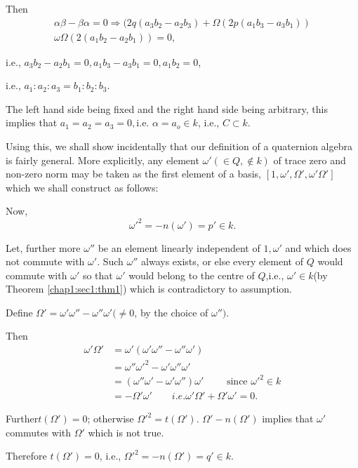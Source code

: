 Then\pageoriginale
\begin{multline*}
  \alpha \beta - \beta \alpha = 0 \Longrightarrow (2q(a_3b_2-a_2 b_3)
  + \Omega (2p(a_1b_3-a_3b_1))\\  
  \omega \Omega (2(a_1 b_2 -a_2 b_1))=0, 
\end{multline*} 

i.e., \quad $a_3 b_2 -a_2 b_1  = 0, a_1b_3 -a_3 b_1 =0, a_1 b_2  = 0$, 

i.e., \quad $a_1 : a_2 : a_3 = b_1 : b_2 : b_3$.

The left hand side being fixed and the right hand side being
arbitrary, this implies that $a_1 = a_2 = a_3 = 0, $i.e. $\alpha = a_o
\in k$, i.e., $C \subset k$. 

Using this, we shall show incidentally that our definition of a
quaternion algebra is fairly general. More explicitly, any element
$\omega' ( \in Q,  \notin k)$ of trace zero and non-zero norm may be
taken as the first element of a basis, $[1, \omega', \Omega', \omega'
  \Omega']$ which we shall  construct as follows: 

Now,
$$
\omega'^2 = -n (\omega') = p' \in k.
$$

Let, further more $\omega''$ be an element linearly independent of $1,
\omega'$ and which does not commute with $\omega'$. Such $\omega''$
always exists, or else every element of $Q$ would commute with
$\omega'$ so that $\omega'$ would belong to the centre of $Q$,i.e.,
$\omega' \in k$(by Theorem \ref{chap1:sec1:thm1}) which is contradictory to assumption. 

Define $\Omega'=\omega' \omega''- \omega'' \omega'( \neq 0$, by the
choice of $\omega'')$. 

Then 
\begin{align*}
  \omega' \Omega' & = \omega'(\omega' \omega'' - \omega'' \omega')\\
  & = \omega'' \omega'^2 - \omega' \omega'' \omega' \\
  & = (\omega'' \omega'-\omega' \omega'')\omega' \qquad \text{ since }
  \omega'^2 \in k\\ 
  & =- \Omega' \omega'  \qquad i.e. \omega' \Omega' + \Omega' \omega' = 0.
\end{align*}

Further\pageoriginale $t (\Omega') = 0$; otherwise $\Omega'^2 = t(\Omega')$. $\Omega'
- n(\Omega')$ implies that $\omega'$ commutes with $\Omega'$ which is
not true. 

Therefore $t(\Omega')=0$, i.e., $\Omega'^2 = -n (\Omega') =q' \in k$. 

